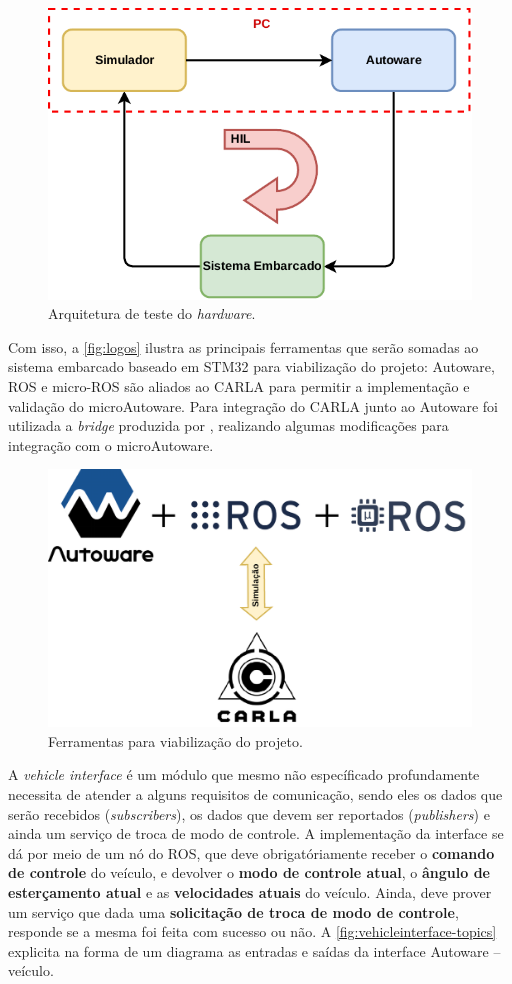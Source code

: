 \begin{figure}[H]
	\centering
	\includegraphics[width=0.55\linewidth]{img/architecture_HIL}
	\caption{Arquitetura de teste do \textit{hardware}.}
	\label{fig:architecture_HIL}
\end{figure}

Com isso, a \autoref{fig:logos} ilustra as principais ferramentas que serão somadas ao sistema embarcado baseado em STM32 para viabilização do projeto: Autoware, ROS e micro-ROS são aliados ao CARLA para permitir a implementação e validação do microAutoware. Para integração do CARLA junto ao Autoware foi utilizada a \textit{bridge} produzida por , realizando algumas modificações para integração com o microAutoware.

\begin{figure}[H]
	\centering
	\includegraphics[width=0.75\linewidth]{img/logos}
	\caption{Ferramentas para viabilização do projeto.}
	\label{fig:logos}
\end{figure}

A \textit{vehicle interface} é um módulo que mesmo não específicado profundamente necessita de atender a alguns requisitos de comunicação, sendo eles os dados que serão recebidos (\textit{subscribers}), os dados que devem ser reportados (\textit{publishers}) e ainda um serviço de troca de modo de controle. A implementação da interface se dá por meio de um nó do ROS, que deve obrigatóriamente receber o \textbf{comando de controle} do veículo, e devolver o \textbf{modo de controle atual}, o \textbf{ângulo de esterçamento atual} e as \textbf{velocidades atuais} do veículo. Ainda, deve prover um serviço que dada uma \textbf{solicitação de troca de modo de controle}, responde se a mesma foi feita com sucesso ou não. A \autoref{fig:vehicleinterface-topics} explicita na forma de um diagrama as entradas e saídas da interface Autoware -- veículo.

